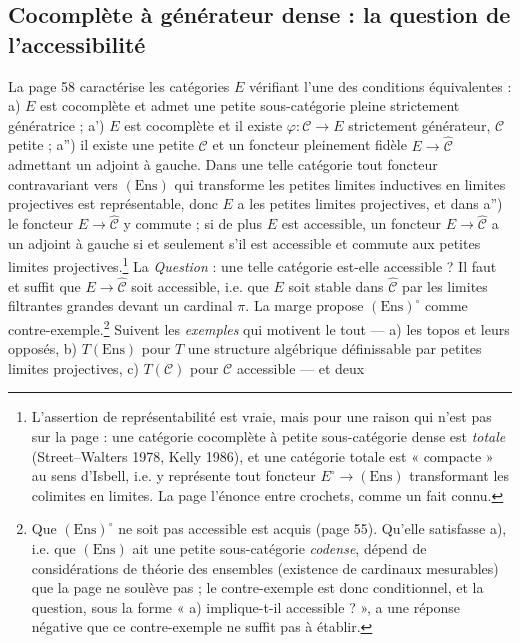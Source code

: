 \documentclass[11pt,a4paper]{article}
\begin{document}
\subsection*{Cocomplète à générateur dense : la question de l'accessibilité}

La page 58 caractérise les catégories $E$ vérifiant l'une des conditions
équivalentes : a) $E$ est cocomplète et admet une petite sous-catégorie
pleine strictement génératrice ; a') $E$ est cocomplète et il existe
$\varphi : \mathcal{C} \to E$ strictement générateur, $\mathcal{C}$
petite ; a'') il existe une petite $\mathcal{C}$ et un foncteur pleinement
fidèle $E \to \widehat{\mathcal{C}}$ admettant un adjoint à gauche. Dans une
telle catégorie tout foncteur contravariant vers $(\mathrm{Ens})$ qui
transforme les petites limites inductives en limites projectives est
représentable, donc $E$ a les petites limites projectives, et dans a'') le
foncteur $E \to \widehat{\mathcal{C}}$ y commute ; si de plus $E$ est
accessible, un foncteur $E \to \widehat{\mathcal{C}}$ a un adjoint à gauche
si et seulement s'il est accessible et commute aux petites limites
projectives.\footnote{L'assertion de représentabilité est vraie, mais pour
une raison qui n'est pas sur la page : une catégorie cocomplète à petite
sous-catégorie dense est \emph{totale} (Street--Walters 1978, Kelly 1986),
et une catégorie totale est « compacte » au sens d'Isbell, i.e. y
représente tout foncteur $E^{\circ} \to (\mathrm{Ens})$ transformant les
colimites en limites. La page l'énonce entre crochets, comme un fait
connu.} La \emph{Question} : une telle catégorie est-elle accessible ? Il
faut et suffit que $E \to \widehat{\mathcal{C}}$ soit accessible, i.e. que
$E$ soit stable dans $\widehat{\mathcal{C}}$ par les limites filtrantes
grandes devant un cardinal $\pi$. La marge propose $(\mathrm{Ens})^{\circ}$
comme contre-exemple.\footnote{Que $(\mathrm{Ens})^{\circ}$ ne soit pas
accessible est acquis (page 55). Qu'elle satisfasse a), i.e. que $(\mathrm{Ens})$
ait une petite sous-catégorie \emph{codense}, dépend de considérations de
théorie des ensembles (existence de cardinaux mesurables) que la page ne
soulève pas ; le contre-exemple est donc conditionnel, et la question,
sous la forme « a) implique-t-il accessible ? », a une réponse négative
que ce contre-exemple ne suffit pas à établir.} Suivent les \emph{exemples}
qui motivent le tout — a) les topos et leurs opposés, b) $T(\mathrm{Ens})$
pour $T$ une structure algébrique définissable par petites limites
projectives, c) $T(\mathcal{C})$ pour $\mathcal{C}$ accessible — et deux
\end{document}
